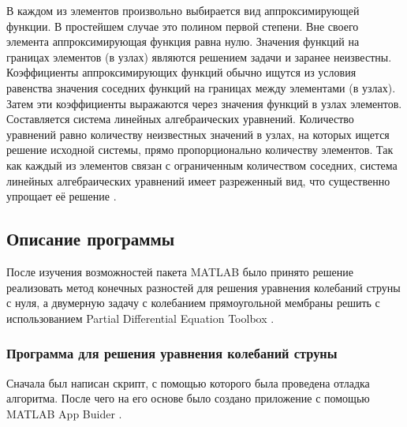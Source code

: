 \documentclass[12pt,a4paper,russian]{report}
\begin{document}
	В каждом из элементов произвольно выбирается вид аппроксимирующей функции. В простейшем случае это полином первой степени. Вне своего элемента аппроксимирующая функция равна нулю. Значения функций на границах элементов (в узлах) являются решением задачи и заранее неизвестны. Коэффициенты аппроксимирующих функций обычно ищутся из условия равенства значения соседних функций на границах между элементами (в узлах). Затем эти коэффициенты выражаются через значения функций в узлах элементов. Составляется система линейных алгебраических уравнений. Количество уравнений равно количеству неизвестных значений в узлах, на которых ищется решение исходной системы, прямо пропорционально количеству элементов. Так как каждый из элементов связан с ограниченным количеством соседних, система линейных алгебраических уравнений имеет разреженный вид, что существенно упрощает её решение \cite{Gallager_MKE}.
	
	
	\subsection{Описание программы}
	
	
	После изучения возможностей пакета MATLAB \cite{Diakonov_MATLAB} было принято решение реализовать метод конечных разностей для решения уравнения колебаний струны с нуля, а двумерную задачу с колебанием прямоугольной мембраны решить с использованием Partial Differential Equation Toolbox \cite{MathWorks_PDEToolbox}.
	
	\subsubsection{Программа для решения уравнения колебаний струны}
	
	 Сначала был написан скрипт, с помощью которого была проведена отладка алгоритма. После чего на его основе было создано приложение с помощью MATLAB App Buider \cite{MathWorks_AppBuilding}.
	 
\end{document}
